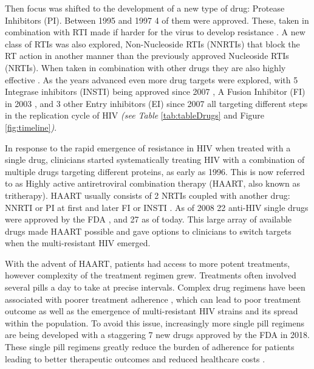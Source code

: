 \documentclass[
  11pt,
  twoside]{scrbook}
\begin{document}
Then focus was shifted to the development of a new type of drug: Protease Inhibitors (PI). Between 1995 and 1997 4 of them were approved. These, taken in combination with RTI made if harder for the virus to develop resistance \autocite{wensingFifteenYearsHIV2010}. A new class of RTIs was also explored, Non-Nucleoside RTIs (NNRTIs) that block the RT action in another manner than the previously approved Nucleoside RTIs (NRTIs). When taken in combination with other drugs they are also highly effective \autocite{pedersenNonNucleosideReverseTranscriptase1999}. As the years advanced even more drug targets were explored, with 5 Integrase inhibitors (INSTI) being approved since 2007 \autocite{scarsiHIV1IntegraseInhibitors2020}, A Fusion Inhibitor (FI) in 2003 \autocite{fletcherEnfuvirtideNewDrug2003}, and 3 other Entry inhibitors (EI) \autocite{esteHIVEntryInhibitors2007,kilbyNovelTherapiesBased2003} since 2007 all targeting different steps in the replication cycle of HIV \emph{(see Table} \ref{tab:tableDrugs} and Figure \ref{fig:timeline}\emph{)}.

In response to the rapid emergence of resistance in HIV when treated with a single drug, clinicians started systematically treating HIV with a combination of multiple drugs targeting different proteins, as early as 1996. This is now referred to as Highly active antiretroviral combination therapy (HAART, also known as tritherapy). HAART usually consists of 2 NRTIs coupled with another drug: NNRTI or PI at first and later FI or INSTI \autocite{yeniUpdateHAARTHIV2006}. As of 2008 22 anti-HIV single drugs were approved by the FDA \autocite{palmisanoBriefHistoryAntiretroviral2011}, and 27 as of today. This large array of available drugs made HAART possible and gave options to clinicians to switch targets when the multi-resistant HIV emerged.

With the advent of HAART, patients had access to more potent treatments, however complexity of the treatment regimen grew. Treatments often involved several pills a day to take at precise intervals. Complex drug regimens have been associated with poorer treatment adherence \autocite{mehtaPotentialFactorsAffecting1997,millerComplianceTreatmentRegimens1997}, which can lead to poor treatment outcome as well as the emergence of multi-resistant HIV strains \autocite{chesneyAdherenceHIVCombination2000} and its spread within the population. To avoid this issue, increasingly more single pill regimens are being developed with a staggering 7 new drugs approved by the FDA in 2018. These single pill regimens greatly reduce the burden of adherence for patients leading to better therapeutic outcomes and reduced healthcare costs \autocite{aldirSingletabletRegimensHIV2014}.
\end{document}

